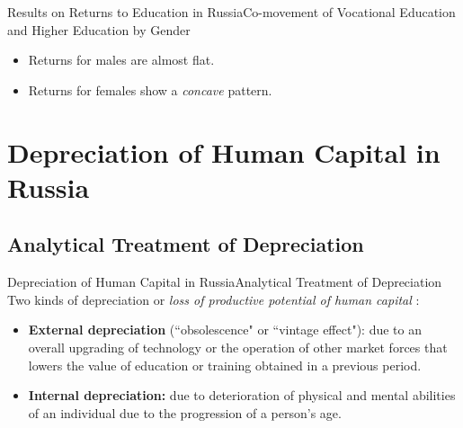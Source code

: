 \documentclass{beamer}
\begin{document}
\begin{frame}{Results on Returns to Education in Russia}{Co-movement of Vocational Education and Higher Education by Gender}
\begin{figure}
		\centering
		\hfill
	\end{figure}
\begin{itemize}
	\vspace*{-0.2in}
	\item Returns for males are almost flat.
	\item Returns for females show a \textit{concave} pattern.
\end{itemize}
\end{frame}

\section{Depreciation of Human Capital in Russia}
\subsection{Analytical Treatment of Depreciation}
\begin{frame}{Depreciation of Human Capital in Russia}{Analytical Treatment of Depreciation}
	Two kinds of depreciation or \textit{loss of productive potential of human capital} \citep{neuman_091._1995}:
	\begin{itemize}
	\item \textbf{External depreciation} (``obsolescence" or ``vintage effect"): due to an overall upgrading of technology or the operation of other market forces that lowers the value of education or training obtained in a previous period.
	\item \textbf{Internal depreciation:} due to deterioration of physical and mental abilities of an individual due to the progression of a person's age.
	\end{itemize}
\end{frame}
\end{document}
